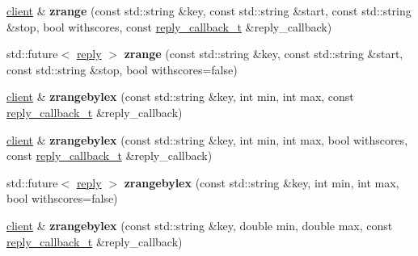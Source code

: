 \begin{DoxyCompactItemize}
\mbox{\hyperlink{classcpp__redis_1_1client}{client}} \& {\bfseries zrange} (const std\+::string \&key, const std\+::string \&start, const std\+::string \&stop, bool withscores, const \mbox{\hyperlink{classcpp__redis_1_1client_af7a65eb21aa25230bfbb0b0203c4fc04}{reply\+\_\+callback\+\_\+t}} \&reply\+\_\+callback)
\item 
\mbox{\label{classcpp__redis_1_1client_aaaaf7f2d11f02bc7709be1b2a654894d}} 
std\+::future$<$ \mbox{\hyperlink{classcpp__redis_1_1reply}{reply}} $>$ {\bfseries zrange} (const std\+::string \&key, const std\+::string \&start, const std\+::string \&stop, bool withscores=false)
\item 
\mbox{\label{classcpp__redis_1_1client_a5921728661050f43652a60333a79aaae}} 
\mbox{\hyperlink{classcpp__redis_1_1client}{client}} \& {\bfseries zrangebylex} (const std\+::string \&key, int min, int max, const \mbox{\hyperlink{classcpp__redis_1_1client_af7a65eb21aa25230bfbb0b0203c4fc04}{reply\+\_\+callback\+\_\+t}} \&reply\+\_\+callback)
\item 
\mbox{\label{classcpp__redis_1_1client_aaeb445a96d9b53dc3d5455a3868823a7}} 
\mbox{\hyperlink{classcpp__redis_1_1client}{client}} \& {\bfseries zrangebylex} (const std\+::string \&key, int min, int max, bool withscores, const \mbox{\hyperlink{classcpp__redis_1_1client_af7a65eb21aa25230bfbb0b0203c4fc04}{reply\+\_\+callback\+\_\+t}} \&reply\+\_\+callback)
\item 
\mbox{\label{classcpp__redis_1_1client_ade8510933eab6587e876b2b574255ea7}} 
std\+::future$<$ \mbox{\hyperlink{classcpp__redis_1_1reply}{reply}} $>$ {\bfseries zrangebylex} (const std\+::string \&key, int min, int max, bool withscores=false)
\item 
\mbox{\label{classcpp__redis_1_1client_a92819187d013805b6f993711adf67ffc}} 
\mbox{\hyperlink{classcpp__redis_1_1client}{client}} \& {\bfseries zrangebylex} (const std\+::string \&key, double min, double max, const \mbox{\hyperlink{classcpp__redis_1_1client_af7a65eb21aa25230bfbb0b0203c4fc04}{reply\+\_\+callback\+\_\+t}} \&reply\+\_\+callback)
\item 
\mbox{\label{classcpp__redis_1_1client_aadf342f2aabeff122f24599d2f6bbd38}} 

\end{DoxyCompactItemize}
